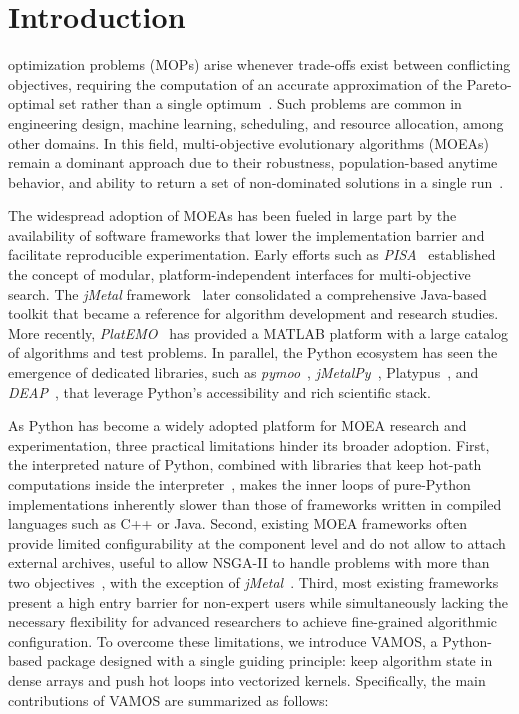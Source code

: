 \documentclass[journal]{IEEEtran}
\begin{document}
\section{Introduction} \label{sec:intro}

 optimization problems (MOPs) arise whenever trade-offs exist between conflicting objectives, requiring the computation of an accurate approximation of the Pareto-optimal set rather than a single optimum~\cite{deb01}. Such problems are common in engineering design, machine learning, scheduling, and resource allocation, among other domains. In this field, multi-objective evolutionary algorithms (MOEAs) remain a dominant approach due to their robustness, population-based anytime behavior, and ability to return a set of non-dominated solutions in a single run~\cite{CLV07}.

The widespread adoption of MOEAs has been fueled in large part by the availability of software frameworks that lower the implementation barrier and facilitate reproducible experimentation. Early efforts such as \textit{PISA}~\cite{BLT+03} established the concept of modular, platform-independent interfaces for multi-objective search. The \textit{jMetal} framework~\cite{DN11} later consolidated a comprehensive Java-based toolkit that became a reference for algorithm development and research studies. More recently, \textit{PlatEMO}~\cite{TCZ+17} has provided a MATLAB platform with a large catalog of algorithms and test problems. In parallel, the Python ecosystem has seen the emergence of dedicated libraries, such as \textit{pymoo}~\cite{BD20}, \textit{jMetalPy}~\cite{BNG+19}, Platypus~\cite{hadka15}, and \textit{DEAP}~\cite{FDG+12}, that leverage Python's accessibility and rich scientific stack. 

As Python has become a widely adopted platform for MOEA research and experimentation, three practical limitations hinder its broader adoption. First, the interpreted nature of Python, combined with libraries that keep hot-path computations inside the interpreter~\cite{BNG+19,FDG+12,hadka15}, makes the inner loops of pure-Python implementations inherently slower than those of frameworks written in compiled languages such as C++ or Java. Second, existing MOEA frameworks often provide limited configurability at the component level and do not allow to attach external archives, useful to allow NSGA-II to handle problems with more than two objectives~\cite{IPS20}, with the exception of \textit{jMetal}~\cite{DN11}. Third, most existing frameworks present a high entry barrier for non-expert users while simultaneously lacking the necessary flexibility for advanced researchers to achieve fine-grained algorithmic configuration. To overcome these limitations, we introduce VAMOS, a Python-based package designed with a single guiding principle: keep algorithm state in dense arrays and push hot loops into vectorized kernels. Specifically, the main contributions of VAMOS are summarized as follows:
\end{document}
